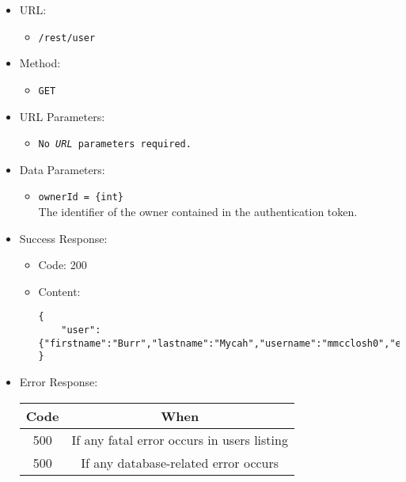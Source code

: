 \begin{itemize}

    \item URL: 
    \begin{itemize}
        \item \texttt{/rest/user}
    \end{itemize}
    
    \item Method: 
    \begin{itemize}
        \item \texttt{GET}
    \end{itemize}
    
    \item URL Parameters: 
    \begin{itemize}
        \item \texttt{No \textit{URL} parameters required.}
    \end{itemize}
    
    \item Data Parameters: 
    \begin{itemize}
        \item \texttt{ownerId = \{int\}} \\
        The identifier of the owner contained in the authentication token.
    \end{itemize}
    
    \item Success Response: 
    \begin{itemize}
        \item Code: 200
        \item Content: 
        \begin{lstlisting}
{
    "user":{"firstname":"Burr","lastname":"Mycah","username":"mmcclosh0","email":"mchaudret0@dailymail.co.uk","telegram_chat_id":null}
}
        \end{lstlisting}    
    \end{itemize}
    
    \item Error Response:
    \begin{table}[!h]
    \centering 
    \begin{tabular}{|c|c|}
    \hline
    \multicolumn{1}{|c|}{\textbf{Code}} & \multicolumn{1}{c|}{\textbf{When}} \\ \hline
    500 & If any fatal error occurs in users listing \\\hline
    500 & If any database-related error occurs \\\hline
    \end{tabular} 
    \end{table} 

\end{itemize}


